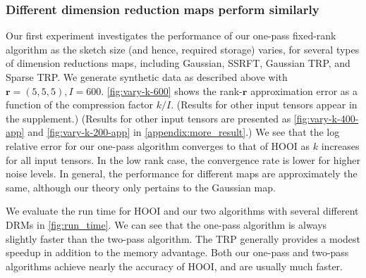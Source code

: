 \subsubsection{Different dimension reduction maps perform similarly}
Our first experiment investigates the performance of our one-pass fixed-rank algorithm
as the sketch size (and hence, required storage) varies,
for several types of dimension reductions maps, including Gaussian, SSRFT, Gaussian TRP, and Sparse TRP.
We generate synthetic data as described above with $\mathbf{r} = (5,5,5), I = 600$.
\ref{fig:vary-k-600} shows the rank-$\mathbf{r}$ approximation error
as a function of the compression factor $k/I$.
\ifdefined \issupplement
(Results for other input tensors appear in the supplement.)
\else
(Results for other input tensors are presented as
\ref{fig:vary-k-400-app} and \ref{fig:vary-k-200-app} in \ref{appendix:more_result}.)
\fi
We see that the log relative error for our one-pass algorithm
converges to that of HOOI as $k$ increases for all input tensors.
In the low rank case, the convergence rate is lower for higher noise levels.
In general, the performance for different maps are approximately the same,
although our theory only pertains to the Gaussian map.

We evaluate the run time for HOOI and our two algorithms with several different DRMs in \ref{fig:run_time}. We can see that the one-pass algorithm is always slightly faster than the two-pass algorithm. The TRP generally provides a modest speedup in addition to the memory advantage.
Both our one-pass and two-pass algorithms achieve nearly the accuracy of HOOI,
and are usually much faster. %

